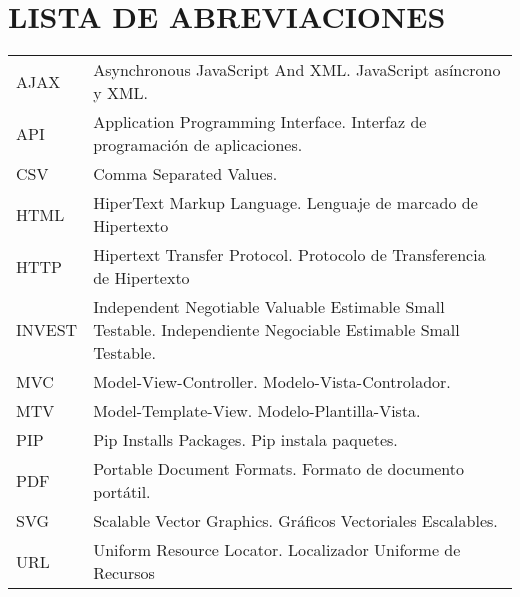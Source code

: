 \chapter*{LISTA DE ABREVIACIONES}

\begin{tabular}{l p{12cm}}
    AJAX \hspace{1cm}   & Asynchronous JavaScript And XML. JavaScript asíncrono y XML.\\
    API \hspace{1cm}   & Application Programming Interface. Interfaz de programación de aplicaciones.\\
    CSV \hspace{1cm}   & Comma Separated Values.\\
    HTML \hspace{1cm}   & HiperText Markup Language. Lenguaje de marcado de Hipertexto \\
    HTTP \hspace{1cm}   & Hipertext Transfer Protocol. Protocolo de
                               Transferencia de Hipertexto            \\
    INVEST \hspace{1cm} &  Independent Negotiable Valuable Estimable Small Testable. Independiente Negociable Estimable Small Testable. \\
    MVC \hspace{1cm}    & Model-View-Controller. Modelo-Vista-Controlador.\\
    MTV \hspace{1cm}    & Model-Template-View. Modelo-Plantilla-Vista. \\
    PIP \hspace{1cm}    & Pip Installs Packages. Pip instala paquetes.\\
    PDF \hspace{1cm}    & Portable Document Formats. Formato de documento portátil.\\
    SVG	\hspace{1cm}    & Scalable Vector Graphics. Gráficos Vectoriales Escalables.\\
    URL	 \hspace{1cm}   & Uniform Resource Locator. Localizador Uniforme de Recursos \\

\end{tabular}
\clearpage
